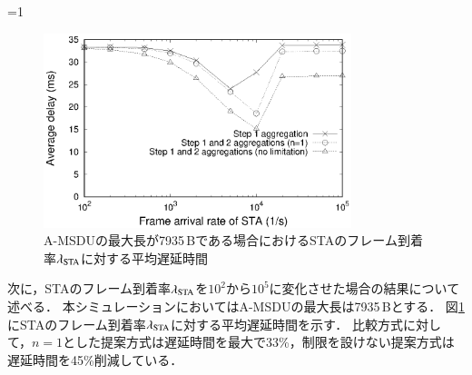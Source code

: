 \documentclass[master]{kuisthesis}		%
\newcounter{flagFig}
\begin{document}
			\ifnum\value{flagFig}=1 {\begin{figure}[htbp]
				\begin{center}
					\includegraphics[width=0.8\textwidth]{graph/dly_lmd.eps}
					\caption{A-MSDUの最大長が7935\,Bである場合におけるSTAのフレーム到着率$\lambda_{\rm STA}$に対する平均遅延時間}
					\label{fig:dly_lmd}
				\end{center}
			\end{figure}}\fi
			次に，STAのフレーム到着率$\lambda_{\rm STA}$を$10^2$から$10^5$に変化させた場合の結果について述べる．
			本シミュレーションにおいてはA-MSDUの最大長は7935\,Bとする．
			図\ref{fig:dly_lmd}にSTAのフレーム到着率$\lambda_{\rm STA}$に対する平均遅延時間を示す．
			比較方式に対して，$n=1$とした提案方式は遅延時間を最大で33\%，制限を設けない提案方式は遅延時間を45\%削減している．
\end{document}
